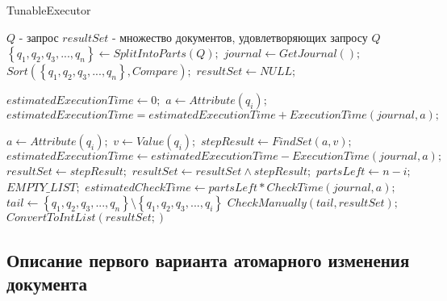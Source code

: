 \documentclass{matmex-diploma}
\begin{document}
        \begin{algorithm}[H]                   
        \caption{TunableExecutor}              
        \label{tunable}                        
            \begin{algorithmic}        
                \REQUIRE $Q$ - запрос
                \ENSURE $resultSet$ - множество документов, удовлетворяющих запросу $Q$
                \STATE $\left\{ q_1, q_2, q_3, ... , q_n \right\} \leftarrow SplitIntoParts(Q);$
                \STATE $journal \leftarrow GetJournal();$
                \STATE $Sort(\left\{ q_1, q_2, q_3, ... , q_n \right\}, Compare);$
                \STATE $resultSet \leftarrow NULL;$
                
                \STATE $estimatedExecutionTime \leftarrow 0;$
                    \STATE $a \leftarrow Attribute(q_i);$
                    \STATE $estimatedExecutionTime = estimatedExecutionTime + ExecutionTime(journal, a);$
                \ENDFOR
                
                    \STATE $a \leftarrow Attribute(q_i);$
                    \STATE $v \leftarrow Value(q_i);$
                    \STATE $stepResult \leftarrow FindSet(a, v);$
                    \STATE $estimatedExecutionTime \leftarrow estimatedExecutionTime - ExecutionTime(journal, a);$
                        \STATE $resultSet \leftarrow stepResult;$
                    \ELSE
                        \STATE $resultSet \leftarrow resultSet \land stepResult;$
                    \ENDIF
                    \STATE $partsLeft \leftarrow n - i;$
                        \RETURN $EMPTY\_LIST;$
                    \ENDIF
                    \STATE $estimatedCheckTime \leftarrow partsLeft * CheckTime(journal, a);$
                        \STATE $tail \leftarrow \left\{ q_1, q_2, q_3, ... , q_n \right\} \setminus \left\{ q_1, q_2, q_3, ... , q_i \right\}$
                        \RETURN $CheckManually(tail, resultSet);$
                    \ENDIF
                \ENDFOR
                \RETURN $ConvertToIntList(resultSet;)$
            \end{algorithmic}
        \end{algorithm}

    \subsection{Описание первого варианта атомарного изменения документа}
\end{document}
